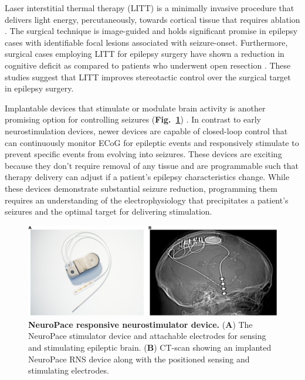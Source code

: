 Laser interstitial thermal therapy (LITT) is a minimally invasive procedure that delivers light energy, percutaneously, towards cortical tissue that requires ablation \cite{tovar-spinoza2013use, medvid2015current}. The surgical technique is image-guided and holds significant promise in epilepsy cases with identifiable focal lesions associated with seizure-onset. Furthermore, surgical cases employing LITT for epilepsy surgery have shown a reduction in cognitive deficit as compared to patients who underwent open resection \cite{drane2015better}. These studies suggest that LITT improves stereotactic control over the surgical target in epilepsy surgery.

Implantable devices that stimulate or modulate brain activity is another promising option for controlling seizures (\textbf{Fig.~\ref{implantable_devices}}) \cite{morrell2011responsive}. In contrast to early neurostimulation devices, newer devices are capable of closed-loop control that can continuously monitor ECoG for epileptic events and responsively stimulate to prevent specific events from evolving into seizures. These devices are exciting because they don't require removal of any tissue and are programmable such that therapy delivery can adjust if a patient's epilepsy characteristics change. While these devices demonstrate substantial seizure reduction, programming them requires an understanding of the electrophysiology that precipitates a patient's seizures and the optimal target for delivering stimulation. 

\begin{figure}
\centering
\includegraphics[width=\textwidth]{implantable_devices}
\caption[NeuroPace RNS Device]{\textbf{NeuroPace responsive neurostimulator device.} (\textbf{A}) The NeuroPace stimulator device and attachable electrodes for sensing and stimulating epileptic brain. (\textbf{B}) CT-scan showing an implanted NeuroPace RNS device along with the positioned sensing and stimulating electrodes.}
\label{implantable_devices}
\end{figure}

